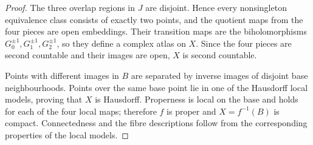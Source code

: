 \begin{proof}
The three overlap regions in $J$ are disjoint.  Hence every nonsingleton
equivalence class consists of exactly two points, and the quotient maps
from the four pieces are open embeddings.  Their transition maps are the
biholomorphisms $G_0^{\pm1},G_1^{\pm1},G_2^{\pm1}$, so they define a
complex atlas on $X$.  Since the four pieces are second countable and their
images are open, $X$ is second countable.

Points with different images in $B$ are separated by inverse images of
disjoint base neighbourhoods.  Points over the same base point lie in one
of the Hausdorff local models, proving that $X$ is Hausdorff.  Properness
is local on the base and holds for each of the four local maps; therefore
$f$ is proper and $X=f^{-1}(B)$ is compact.  Connectedness and the fibre
descriptions follow from the corresponding properties of the local
models.
\end{proof}

